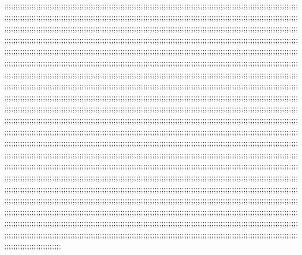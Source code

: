 ;;;;;;;;;;;;;;;;;;;;;;;;;;;;;;;;;;;;;;;;;;;;;;;;;;;;;;;;;;;;;;;;;;;;;;;;;;;;;;;;;;;;;;;;;;;;;;;;;;;;;;;;;;;;;;;;;;;;;;;;;;;;;;;;;;;;;;;;;;;;;;;;;;;;;;;;;;;;;;;;;;;;;;;;;;;;;;;;;;;;;;;;;;;;;;;;;;;;;;;;;;;;;;;;;;;;;;;;;;;;;;;;;;;;;;;;;;;;;;;;;;;;;;;;;;;;;;;;;;;;;;;;;;;;;;;;;;;;;;;;;;;;;;;;;;;;;;;;;;;;;;;;;;;;;;;;;;;;;;;;;;;;;;;;;;;;;;;;;;;;;;;;;;;;;;;;;;;;;;;;;;;;;;;;;;;;;;;;;;;;;;;;;;;;;;;;;;;;;;;;;;;;;;;;;;;;;;;;;;;;;;;;;;;;;;;;;;;;;;;;;;;;;;;;;;;;;;;;;;;;;;;;;;;;;;;;;;;;;;;;;;;;;;;;;;;;;;;;;;;;;;;;;;;;;;;;;;;;;;;;;;;;;;;;;;;;;;;;;;;;;;;;;;;;;;;;;;;;;;;;;;;;;;;;;;;;;;;;;;;;;;;;;;;;;;;;;;;;;;;;;;;;;;;;;;;;;;;;;;;;;;;;;;;;;;;;;;;;;;;;;;;;;;;;;;;;;;;;;;;;;;;;;;;;;;;;;;;;;;;;;;;;;;;;;;;;;;;;;;;;;;;;;;;;;;;;;;;;;;;;;;;;;;;;;;;;;;;;;;;;;;;;;;;;;;;;;;;;;;;;;;;;;;;;;;;;;;;;;;;;;;;;;;;;;;;;;;;;;;;;;;;;;;;;;;;;;;;;;;;;;;;;;;;;;;;;;;;;;;;;;;;;;;;;;;;;;;;;;;;;;;;;;;;;;;;;;;;;;;;;;;;;;;;;;;;;;;;;;;;;;;;;;;;;;;;;;;;;;;;;;;;;;;;;;;;;;;;;;;;;;;;;;;;;;;;;;;;;;;;;;;;;;;;;;;;;;;;;;;;;;;;;;;;;;;;;;;;;;;;;;;;;;;;;;;;;;;;;;;;;;;;;;;;;;;;;;;;;;;;;;;;;;;;;;;;;;;;;;;;;;;;;;;;;;;;;;;;;;;;;;;;;;;;;;;;;;;;;;;;;;;;;;;;;;;;;;;;;;;;;;;;;;;;;;;;;;;;;;;;;;;;;;;;;;;;;;;;;;;;;;;;;;;;;;;;;;;;;;;;;;;;;;;;;;;;;;;;;;;;;;;;;;;;;;;;;;;;;;;;;;;;;;;;;;;;;;;;;;;;;;;;;;;;;;;;;;;;;;;;;;;;;;;;;;;;;;;;;;;;;;;;;;;;;;;;;;;;;;;;;;;;;;;;;;;;;;;;;;;;;;;;;;;;;;;;;;;;;;;;;;;;;;;;;;;;;;;;;;;;;;;;;;;;;;;;;;;;;;;;;;;;;;;;;;;;;;;;;;;;;;;;;;;;;;;;;;;;;;;;;;;;;;;;;;;;;;;;;;;;;;;;;;;;;;;;;;;;;;;;;;;;;;;;;;;;;;;;;;;;;;;;;;;;;;;;;;;;;;;;;;;;;;;;;;;;;;;;;;;;;;;;;;;;;;;;;;;;;;;;;;;;;;;;;;;;;;;;;;;;;;;;;;;;;;;;;;;;;;;;;;;;;;;;;;;;;;;;;;;;;;;;;;;;;;;;;;;;;;;;;;;;;;;;;;;;;;;;;;;;;;;;;;;;;;;;;;;;;;;;;;;;;;;;;;;;;;;;;;;;;;;;;;;;;;;;;;;;;;;;;;;;;;;;;;;;;;;;;;;;;;;;;;;;;;;;;;;;;;;;;;;;;;;;;;;;;;;;;;;;;;;;;;;;;;;;;;;;;;;;;;;;;;;;;;;;;;;;;;;;;;;;;;;;;;;;;;;;;;;;;;;;;;;;;;;;;;;;;;;;;;;;;;;;;;;;;;;;;;;;;;;;;;;;;;;;;;;;;;;;;;;;;;;;;;;;;;;;;;;;;;;;;;;;;;;;;;;;;;;;;;;;;;;;;;;;;;;;;;;;;;;;;;;;;;;;;;;;;;;;;;;;;;;;;;;;;;;;;;;;;;;;;;;;;;;;;;;;;;;;;;;;;;;;;;;;;;;;;;;;;;;;;;;;;;;;;;;;;;;;;;;;;;;;;;;;;;;;;;;;;;;;;;;;;;;;;;;;;;;;;;;;;;;;;;;;;;;;;;;;;;;;;;;;;;;;;;;;;;;;;;;;;;;;;;;;;;;;;;;;;;;;;;;;;;;;;;;;;;;;;;;;;;;;;;;;;;;;;;;;;;;;;;;;;;;;;;;;;;;;;;;;;;;;;;;;;;;;;;;;;;;;;;;;;;;;;;;;;;;;;;;;;;;;;;;;;;;;;;;;;;;;;;;;;;;;;;;;;;;;;;;;;;;;;;;;;;;;;;;;;;;;;;;;;;;;;;;;;;;;;;;;;;;;;;;;;;;;;;;;;;;;;;;;;;;;;;;;;;;;;;;;;;;;;;;;;;;;;;;;;;;;;;;;;;;;;;;;;;;;;;;;;;;;;;;;;;;;;;;;;;;;;;;;;;;;;;;;;;;;;;;;;;;;;;;;;;;;;;;;;;;;;;;;;;;;;;;;;;;;;;;;;;;;;;;;;;;;;;;;;;;;;;;;;;;;;;;;;;;;;;;;;;;;;;;;;;;;;;;;;;;;;;;;;;;;;;;;;;;;;;;;;;;;;;;;;;;;;;;;;;;;;;;;;;;;;;;;;;;;;;;;;;;;;;;;;;;;;;;;;;;;;;;;;;;;;;;;;;;;;;;;;;;;;;;;;;;;;;;;;;;;;;;;;;;;;;;;;;;;;;;;;;;;;;;;;;;;;;;;;;;;;;;;;;;;;;;;;;;;;;;;;;;;;;;;;;;
%
%


